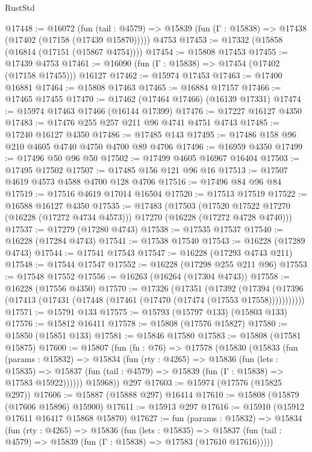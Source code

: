 \begin{lexlean}{RustStd}
\begin{coremodule}
@17448 := @16072
    (fun (tail : @4579) => @15839 (fun (Γ : @15838) => @17438 (@17402 (@17158 (@17439 @15870)))))
    @4753
@17453 := @17332 (@15858 (@16814 (@17151 (@15867 @4754))))
@17454 := @15808 @17453
@17455 := @17439 @4753
@17461 := @16090 (fun (Γ : @15838) => @17454 (@17402 (@17158 @17455))) @16127
@17462 := @15974 @17453
@17463 := @17400 @16881
@17464 := @15808 @17463
@17465 := @16884 @17157
@17466 := @17465 @17455
@17470 := @17462 (@17464 @17466) (@16139 @17331)
@17474 := @15974 @17463 @17466 (@16144 @17399)
@17476 := @17227 @16127 @4350
@17483 := @17476 @255 @257 @211 @96 @4741 @4751 @4743
@17485 := @17240 @16127 @4350
@17486 := @17485 @143
@17495 := @17486 @158 @96 @210 @4605 @4740 @4750 @4700 @89 @4706
@17496 := @16959 @4350
@17499 := @17496 @50 @96 @50
@17502 := @17499 @4605 @16967 @16404
@17503 := @17495 @17502
@17507 := @17485 @156 @121 @96 @16
@17513 := @17507 @4619 @4573 @4588 @4700 @128 @4706
@17516 := @17496 @84 @96 @84
@17519 := @17516 @4619 @17014 @16504
@17520 := @17513 @17519
@17522 := @16588 @16127 @4350
@17535 := @17483
    (@17503
      (@17520 @17522 @17270 (@16228 (@17272 @4734 @4573)))
      @17270
      (@16228 (@17272 @4728 @4740)))
@17537 := @17279 (@17280 @4743)
@17538 := @17535 @17537
@17540 := @16228 (@17284 @4743)
@17541 := @17538 @17540
@17543 := @16228 (@17289 @4743)
@17544 := @17541 @17543
@17547 := @16228 (@17293 @4743 @211)
@17548 := @17544 @17547
@17552 := @16228 (@17298 @255 @211 @96)
@17553 := @17548 @17552
@17556 := @16263 (@16264 (@17304 @4743))
@17558 := @16228 (@17556 @4350)
@17570 := @17326
    (@17351
      (@17392
        (@17394 (@17396 (@17413 (@17431 (@17448 (@17461 (@17470 (@17474 (@17553 @17558)))))))))))
@17571 := @15791 @133
@17575 := @15793 (@15797 @133) (@15803 @133)
@17576 := @15812 @16411
@17578 := @15808 (@17576 @15827)
@17580 := @15850 (@15851 @133)
@17581 := @15846 @17580
@17583 := @15808 (@17581 @15875)
@17600 := @15807
    (fun (fn : @76) =>
    @17578
      (@15830
        (@15833
          (fun (params : @15832) =>
          @15834
            (fun (rty : @4265) =>
            @15836
              (fun (lets : @15835) =>
              @15837 (fun (tail : @4579) => @15839 (fun (Γ : @15838) => @17583 @15922))))))
        @15968))
    @297
@17603 := @15974 (@17576 (@15825 @297))
@17606 := @15887 (@15888 @297) @16414
@17610 := @15808 (@15879 (@17606 @15896) @15900)
@17611 := @15913 @297
@17616 := @15910 (@15912 @17611 @16417 @15868 @15870)
@17627 := fun (params : @15832) =>
  @15834
    (fun (rty : @4265) =>
    @15836
      (fun (lets : @15835) =>
      @15837 (fun (tail : @4579) => @15839 (fun (Γ : @15838) => @17583 (@17610 @17616)))))

\end{coremodule}
\end{lexlean}
